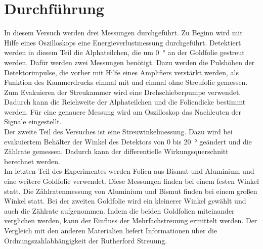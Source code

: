 \section{Durchführung}
In diesem Versuch werden drei Messungen durchgeführt.
Zu Beginn wird mit Hilfe eines Oszilloskops eine Energieverlustmessung
durchgeführt. Detektiert werden in diesem Teil die Alphateilchen, die um
\SI{0}{\degree} an der Goldfolie gestreut werden. Dafür werden zwei Messungen
benötigt. Dazu werden die Pulshöhen der Detektorimpulse, die vorher mit Hilfe
eines Amplifiers verstärkt werden, als Funktion des Kammerdrucks einmal mit und
einmal ohne Streufolie gemessen. Zum Evakuieren der Streukammer wird eine
Drehschieberpumpe verwendet. Dadurch kann die Reichweite der Alphateilchen und
die Foliendicke bestimmt werden. Für eine genauere Messung wird am Oszilloskop
das Nachleuten der Signale eingestellt. \\
Der zweite Teil des Versuches ist eine Streuwinkelmessung. Dazu wird bei
evakuiertem Behälter der Winkel des Detektors von $0$ bis \SI{20}{\degree}
geändert und die Zählrate gemessen. Dadurch kann der differentielle
Wirkungsquerschnitt berechnet werden. \\
Im letzten Teil des Experimentes werden Folien aus Bismut und Aluminium und eine
weitere Goldfolie verwendet. Diese Messungen finden bei einem festen Winkel statt.
Die Zählratenmessung von Aluminium und Bismut finden bei einem
großen Winkel statt. Bei der zweiten Goldfolie wird ein kleinerer Winkel
gewählt und auch die Zählrate aufgenommen. Indem die beiden Goldfolien miteinander
verglichen werden, kann der Einfluss der Mehrfachstreuung ermittelt werden. Der
Vergleich mit den anderen Materialien liefert Informationen über die
Ordnungszahlabhängigkeit der Rutherford Streuung.
